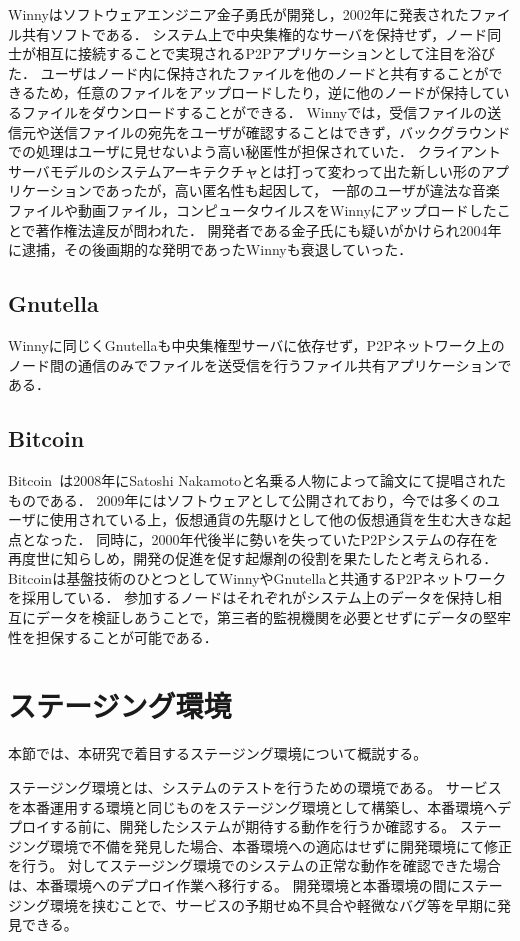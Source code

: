 Winnyはソフトウェアエンジニア金子勇氏が開発し，2002年に発表されたファイル共有ソフトである．
システム上で中央集権的なサーバを保持せず，ノード同士が相互に接続することで実現されるP2Pアプリケーションとして注目を浴びた．
ユーザはノード内に保持されたファイルを他のノードと共有することができるため，任意のファイルをアップロードしたり，逆に他のノードが保持しているファイルをダウンロードすることができる．
Winnyでは，受信ファイルの送信元や送信ファイルの宛先をユーザが確認することはできず，バックグラウンドでの処理はユーザに見せないよう高い秘匿性が担保されていた．
クライアントサーバモデルのシステムアーキテクチャとは打って変わって出た新しい形のアプリケーションであったが，高い匿名性も起因して，
一部のユーザが違法な音楽ファイルや動画ファイル，コンピュータウイルスをWinnyにアップロードしたことで著作権法違反が問われた．
開発者である金子氏にも疑いがかけられ2004年に逮捕，その後画期的な発明であったWinnyも衰退していった．

\subsection{Gnutella}

Winnyに同じくGnutellaも中央集権型サーバに依存せず，P2Pネットワーク上のノード間の通信のみでファイルを送受信を行うファイル共有アプリケーションである．

\subsection{Bitcoin}

Bitcoin~\cite{Bitcoin}は2008年にSatoshi Nakamotoと名乗る人物によって論文にて提唱されたものである．
2009年にはソフトウェアとして公開されており，今では多くのユーザに使用されている上，仮想通貨の先駆けとして他の仮想通貨を生む大きな起点となった．
同時に，2000年代後半に勢いを失っていたP2Pシステムの存在を再度世に知らしめ，開発の促進を促す起爆剤の役割を果たしたと考えられる．
Bitcoinは基盤技術のひとつとしてWinnyやGnutellaと共通するP2Pネットワークを採用している．
参加するノードはそれぞれがシステム上のデータを保持し相互にデータを検証しあうことで，第三者的監視機関を必要とせずにデータの堅牢性を担保することが可能である．

\section{ステージング環境}
\label{bg:staging}

本節では、本研究で着目するステージング環境について概説する。

ステージング環境とは、システムのテストを行うための環境である。
サービスを本番運用する環境と同じものをステージング環境として構築し、本番環境へデプロイする前に、開発したシステムが期待する動作を行うか確認する。
ステージング環境で不備を発見した場合、本番環境への適応はせずに開発環境にて修正を行う。
対してステージング環境でのシステムの正常な動作を確認できた場合は、本番環境へのデプロイ作業へ移行する。
開発環境と本番環境の間にステージング環境を挟むことで、サービスの予期せぬ不具合や軽微なバグ等を早期に発見できる。

